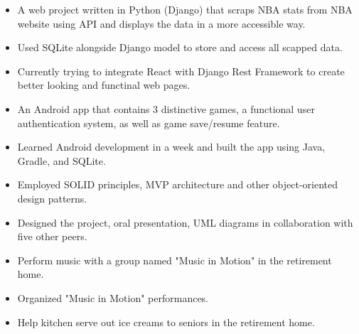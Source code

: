 \documentclass[10pt,a4paper]{altacv}
\begin{document}
\divider

\begin{itemize}
    \item A web project written in Python (Django) that scraps NBA stats from NBA website using API and displays the data in a more accessible way.
    \item Used SQLite alongside Django model to store and access all scapped data.
    \item Currently trying to integrate React with Django Rest Framework to create better looking and functinal web pages.
\end{itemize}

\divider

\begin{itemize}
	\item An Android app that contains 3 distinctive games, a functional user authentication system, as well as game save/resume feature.
  \item Learned Android development in a week and built the app using Java, Gradle, and SQLite.
  \item Employed SOLID principles, MVP architecture and other object-oriented design patterns.
	\item Designed the project, oral presentation, UML diagrams in collaboration with five other peers.
\end{itemize}



\begin{itemize}
    \item Perform music with a group named "Music in Motion" in the retirement home.
    \item Organized "Music in Motion" performances.
    \item Help kitchen serve out ice creams to seniors in the retirement home.
\end{itemize}
\end{document}
